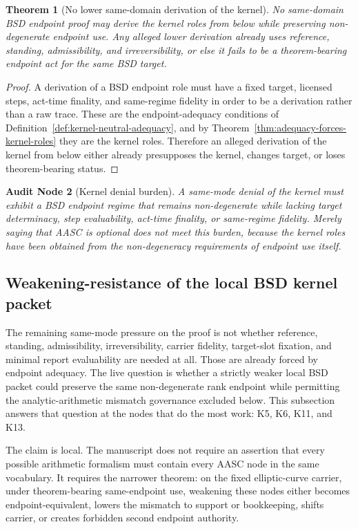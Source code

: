\documentclass[11pt]{article}
\newtheorem{theorem}{Theorem}[section]
\newtheorem{audit}[theorem]{Audit Node}
\begin{document}
\begin{theorem}[No lower same-domain derivation of the kernel]\label{thm:no-lower-kernel}
No same-domain BSD endpoint proof may derive the kernel roles from below while preserving non-degenerate endpoint use. Any alleged lower derivation already uses reference, standing, admissibility, and irreversibility, or else it fails to be a theorem-bearing endpoint act for the same BSD target.
\end{theorem}

\begin{proof}
A derivation of a BSD endpoint role must have a fixed target, licensed steps, act-time finality, and same-regime fidelity in order to be a derivation rather than a raw trace. These are the endpoint-adequacy conditions of Definition~\ref{def:kernel-neutral-adequacy}, and by Theorem~\ref{thm:adequacy-forces-kernel-roles} they are the kernel roles. Therefore an alleged derivation of the kernel from below either already presupposes the kernel, changes target, or loses theorem-bearing status.
\end{proof}

\begin{audit}[Kernel denial burden]\label{audit:kernel-denial-burden}
A same-mode denial of the kernel must exhibit a BSD endpoint regime that remains non-degenerate while lacking target determinacy, step evaluability, act-time finality, or same-regime fidelity. Merely saying that AASC is optional does not meet this burden, because the kernel roles have been obtained from the non-degeneracy requirements of endpoint use itself.
\end{audit}

\subsection{Weakening-resistance of the local BSD kernel packet}

The remaining same-mode pressure on the proof is not whether reference, standing, admissibility, irreversibility, carrier fidelity, target-slot fixation, and minimal report evaluability are needed at all. Those are already forced by endpoint adequacy. The live question is whether a strictly weaker local BSD packet could preserve the same non-degenerate rank endpoint while permitting the analytic-arithmetic mismatch governance excluded below. This subsection answers that question at the nodes that do the most work: K5, K6, K11, and K13.

The claim is local. The manuscript does not require an assertion that every possible arithmetic formalism must contain every AASC node in the same vocabulary. It requires the narrower theorem: on the fixed elliptic-curve carrier, under theorem-bearing same-endpoint use, weakening these nodes either becomes endpoint-equivalent, lowers the mismatch to support or bookkeeping, shifts carrier, or creates forbidden second endpoint authority.
\end{document}
